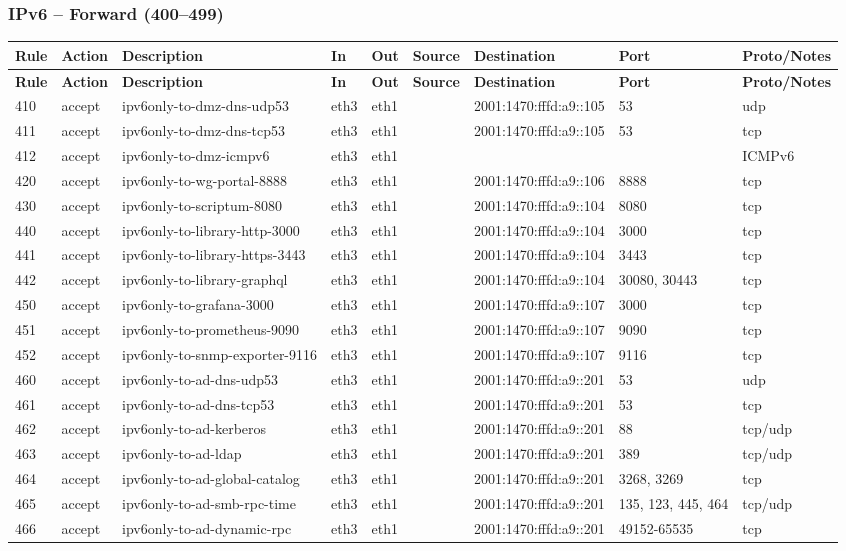 \documentclass[a4paper,11pt]{article}
\begin{document}
\begin{landscape}
\subsubsection{IPv6 -- Forward (400--499)}
\begin{longtable}{|l|l|l|l|l|l|l|p{2.2cm}|l|}
\hline
\textbf{Rule} & \textbf{Action} & \textbf{Description} & \textbf{In} & \textbf{Out} & \textbf{Source} & \textbf{Destination} & \textbf{Port} & \textbf{Proto/Notes} \\
\hline
\endfirsthead
\hline
\textbf{Rule} & \textbf{Action} & \textbf{Description} & \textbf{In} & \textbf{Out} & \textbf{Source} & \textbf{Destination} & \textbf{Port} & \textbf{Proto/Notes} \\
\hline
\endhead
410 & accept & ipv6only-to-dmz-dns-udp53 & eth3 & eth1 & & 2001:1470:fffd:a9::105 & 53 & udp \\
411 & accept & ipv6only-to-dmz-dns-tcp53 & eth3 & eth1 & & 2001:1470:fffd:a9::105 & 53 & tcp \\
412 & accept & ipv6only-to-dmz-icmpv6 & eth3 & eth1 & & & & ICMPv6 \\
420 & accept & ipv6only-to-wg-portal-8888 & eth3 & eth1 & & 2001:1470:fffd:a9::106 & 8888 & tcp \\
430 & accept & ipv6only-to-scriptum-8080 & eth3 & eth1 & & 2001:1470:fffd:a9::104 & 8080 & tcp \\
440 & accept & ipv6only-to-library-http-3000 & eth3 & eth1 & & 2001:1470:fffd:a9::104 & 3000 & tcp \\
441 & accept & ipv6only-to-library-https-3443 & eth3 & eth1 & & 2001:1470:fffd:a9::104 & 3443 & tcp \\
442 & accept & ipv6only-to-library-graphql & eth3 & eth1 & & 2001:1470:fffd:a9::104 & 30080, 30443 & tcp \\
450 & accept & ipv6only-to-grafana-3000 & eth3 & eth1 & & 2001:1470:fffd:a9::107 & 3000 & tcp \\
451 & accept & ipv6only-to-prometheus-9090 & eth3 & eth1 & & 2001:1470:fffd:a9::107 & 9090 & tcp \\
452 & accept & ipv6only-to-snmp-exporter-9116 & eth3 & eth1 & & 2001:1470:fffd:a9::107 & 9116 & tcp \\
460 & accept & ipv6only-to-ad-dns-udp53 & eth3 & eth1 & & 2001:1470:fffd:a9::201 & 53 & udp \\
461 & accept & ipv6only-to-ad-dns-tcp53 & eth3 & eth1 & & 2001:1470:fffd:a9::201 & 53 & tcp \\
462 & accept & ipv6only-to-ad-kerberos & eth3 & eth1 & & 2001:1470:fffd:a9::201 & 88 & tcp/udp \\
463 & accept & ipv6only-to-ad-ldap & eth3 & eth1 & & 2001:1470:fffd:a9::201 & 389 & tcp/udp \\
464 & accept & ipv6only-to-ad-global-catalog & eth3 & eth1 & & 2001:1470:fffd:a9::201 & 3268, 3269 & tcp \\
465 & accept & ipv6only-to-ad-smb-rpc-time & eth3 & eth1 & & 2001:1470:fffd:a9::201 & 135, 123, 445, 464 & tcp/udp \\
466 & accept & ipv6only-to-ad-dynamic-rpc & eth3 & eth1 & & 2001:1470:fffd:a9::201 & 49152-65535 & tcp \\
\hline
\end{longtable}


\end{landscape}
\end{document}
